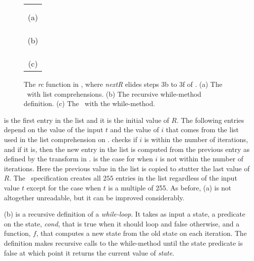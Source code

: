 \begin{figure}[t]
  \begin{center}
    \begin{tabular}{l}
      \usebox{\RcCry} \\ \\
      \multicolumn{1}{c}{(a)} \\ \\
      \usebox{\whilemethod} \\ \\
      \multicolumn{1}{c}{(b)} \\ \\ 
      \usebox{\RcCryLib} \\ \\
      \multicolumn{1}{c}{(c)}
    \end{tabular}
  \end{center}
  \caption{The \emph{rc} function in \cryptol, where \emph{nextR} elides steps 3b to 3f of . (a) The \cryptol\ with list comprehensions. (b) The recursive while-method definition. (c) The \cryptol\ with the while-method.}
  \label{fig:rccry}
\end{figure}

 is the first entry in the list and it is the initial value of $R$.
The following entries depend on the value of the input $t$ and the value of $i$ that comes from the list used in the list comprehension on .
 checks if $i$ is within the number of iterations, and if it is, then the new entry in the list is computed from the previous entry as defined by the transform in .
 is the case for when $i$ is not within the number of iterations.
Here the previous value in the list is copied to stutter the last value of $R$. 
The \cryptol\ specification creates all $255$ entries in the list regardless of the input value $t$ except for the case when $t$ is a multiple of 255.
As before, (a) is not altogether unreadable, but it can be improved considerably.

(b) is a recursive definition of a \emph{while-loop}.
It takes as input a state, a predicate on the state, \emph{cond}, that is true when it should loop and false otherwise, and a function, $f$, that computes a new state from the old state on each iteration.
The definition makes recursive calls to the while-method until the state predicate is false at which point it returns the current value of \emph{state}.

